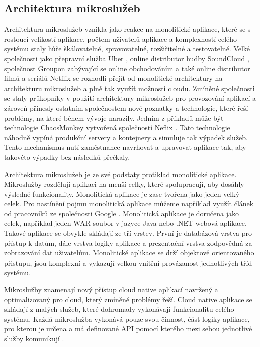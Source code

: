 \subsection{Architektura mikroslužeb}
Architektura mikroslužeb vznikla jako reakce na monolitické aplikace, které se s rostoucí velikostí aplikace, počtem uživatelů aplikace a komplexností celého systému staly hůře škálovatelné, spravovatelné, rozšiřitelné a testovatelné. Velké společnosti jako přepravní služba Uber \cite{uber}, online distributor hudby SoundCloud \cite{soundcloud}, společnost \linebreak Groupon zabývající se online obchodováním \cite{groupon} a také online distributor filmů a seriálů Netflix se rozhodli přejít od monolitické architektury na architekturu mikroslužeb a plně tak využít možností cloudu. Zmíněné společnosti se staly průkopníky v použití architektury mikroslužeb pro provozování aplikací a zároveň přinesly ostatním \linebreak společnostem nové poznatky a technologie, které řeší problémy, na které během vývoje narazily. Jedním z příkladů může být technologie ChaosMonkey vytvořená společností Neflix \cite{chaosmonkey}. Tato technologie náhodně vypíná produkční servery a kontejnery a simuluje tak výpadek služeb. Tento mechanismus nutí zaměstnance navrhovat a upravovat aplikace tak, aby takovéto výpadky bez následků přečkaly.\par
Architektura mikroslužeb je ze své podstaty protiklad monolitické aplikace. \linebreak Mikroslužby rozdělují aplikaci na menší celky, které spolupracují, aby dosáhly výsledné funkcionality. Monolitická aplikace je zase tvořena jako jeden velký celek. Pro nastínění pojmu monolitická aplikace můžeme například využít článek od pracovníků \linebreak ze společnosti Google \cite{googleMonolith}. Monolitická aplikace je doručena jako celek, například jeden WAR soubor v jazyce Java nebo .NET webová aplikace. Takové aplikace se obvykle skládají ze tří vrstev. První je databázová vrstva pro přístup k datům, dále vrstva logiky aplikace a prezentační vrstva zodpovědná za zobrazování dat uživatelům. Monolitické aplikace se drží objektově orientovaného přistupu, jsou komplexní a vykazují velkou vnitřní provázanost jednotlivých tříd systému. \par
Mikroslužby znamenají nový přístup cloud native aplikací navržený a optimalizovaný pro cloud, který zmíněné problémy řeší. Cloud native aplikace se skládají \linebreak z malých služeb, které dohromady vykonávají funkcionalitu celého systému. Každá mikroslužba vykonává pouze svou činnost, část logiky aplikace, pro kterou je určena a má definované API pomocí kterého mezi sebou jednotlivé služby komunikují \cite{balalaieMicroservies}. \par
